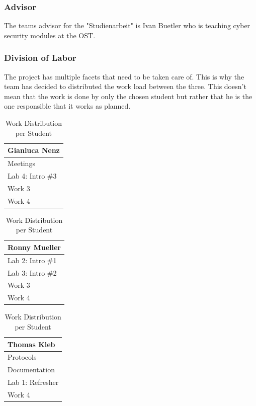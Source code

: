 \subsubsection*{Advisor}
The teams advisor for the "Studienarbeit" is Ivan Buetler who is teaching cyber security modules at the OST.

\subsubsection*{Division of Labor}
The project has multiple facets that need to be taken care of. This is why the team has decided to distributed the work load between the three. This doesn't mean that the work is done by only the chosen student but rather that he is the one responsible that it works as planned.
\begin{table}[H]
    \begin{tabular}[t]{||p{4cm}||}
        \hline
        Gianluca Nenz \\
        \hline\hline
        Meetings \\ 
        \hline
        Lab 4: Intro \#3 \\
        \hline
        Work 3 \\ 
        \hline
        Work 4\\[1ex] 
        \hline
    \end{tabular}
    \hfill
    \begin{tabular}[t]{||p{4cm}||}
        \hline
        Ronny Mueller \\
        \hline\hline
        Lab 2: Intro \#1 \\ 
        \hline
        Lab 3: Intro \#2 \\
        \hline
        Work 3 \\ 
        \hline
        Work 4\\[1ex] 
        \hline
    \end{tabular}
    \hfill
    \begin{tabular}[t]{||p{4cm}||}
        \hline
        Thomas Kleb \\
        \hline\hline
        Protocols \\ 
        \hline
        Documentation \\
        \hline
        Lab 1: Refresher \\ 
        \hline
        Work 4\\[1ex] 
        \hline
    \end{tabular}
    \caption{Work Distribution per Student}
    \label{work_dis}
\end{table}

